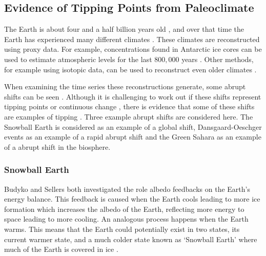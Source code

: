 \subsection{Evidence of Tipping Points from Paleoclimate}
The Earth is about four and a half billion years old \parencite{Dalrymple2001}, and over that time the Earth has experienced many different climates \parencite{Alley2003}.
These climates are reconstructed using proxy data. For example,  concentrations found in Antarctic ice cores can be used to estimate atmospheric  levels for the
last $800,000$ years \parencite{Bereiter2015}. Other methods, for example using isotopic data, can be used to reconstruct even older climates \parencite{Tierney2020}.

When examining the time series these reconstructions generate, some abrupt shifts can be seen \parencite{Boers2022,Brovkin2021}. Although it is challenging to work out if these
shifts represent tipping points or continuous change \parencite{Brovkin2008}, there is evidence that some of these shifts are examples of tipping \parencite{Dakos2008}.
Three example abrupt shifts are considered here.
The Snowball Earth is considered as an example of a global shift, Dansgaard-Oeschger events as an example of a rapid abrupt shift and the Green Sahara as an example of a abrupt shift in
the biosphere.

\subsubsection{Snowball Earth}
Budyko and Sellers \parencite{Budyko1969,Sellers1969} both investigated the role albedo feedbacks on the Earth's energy balance. This feedback is caused when the Earth cools leading to more
ice formation which increases the albedo of the Earth, reflecting more energy to space leading to more cooling. An analogous process happens when the Earth warms. This means that the
Earth could potentially exist in two states, its current warmer state, and a much colder state known as `Snowball Earth' where much of the Earth is covered in ice \parencite{Ghil1976,Held1974}. 

